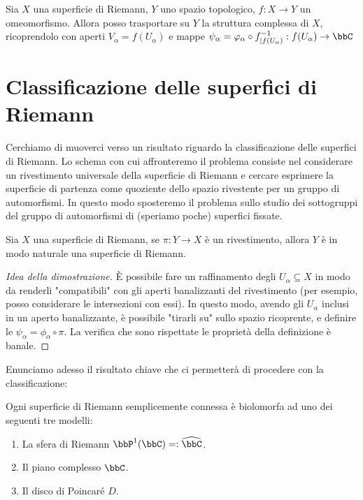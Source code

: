 \begin{osservazione}
Sia $X$ una superficie di Riemann, $Y$ uno spazio topologico, $f:X\rightarrow Y$ un omeomorfismo. Allora posso trasportare su $Y$ la struttura complessa di $X$, ricoprendolo con aperti $V_\alpha=f(U_\alpha)$ e mappe $\psi_\alpha=\varphi_\alpha \circ f^{-1}_{|f(U_\alpha)}:f(U_\alpha)\rightarrow\bbC$
\end{osservazione}


\section{Classificazione delle superfici di Riemann}
Cerchiamo di muoverci verso un risultato riguardo la classificazione delle superfici di Riemann. Lo schema con cui affronteremo il problema consiste nel considerare un rivestimento universale della superficie di Riemann e cercare esprimere la superficie di partenza come quoziente dello spazio rivestente per un gruppo di automorfismi. In questo modo sposteremo il problema sullo studio dei sottogruppi del gruppo di automorfismi di (speriamo poche) superfici fissate.
\begin{osservazione}
Sia $X$ una superficie di Riemann, se $\pi:Y\rightarrow X$ è un rivestimento, allora $Y$ è in modo naturale una superficie di Riemann.
\end{osservazione} 
\begin{proof}[Idea della dimostrazione]
È possibile fare un raffinamento degli $U_\alpha\subseteq X$ in modo da renderli "compatibili" con gli aperti banalizzanti del rivestimento (per esempio, posso considerare le intersezioni con essi). In questo modo, avendo gli $U_\alpha$ inclusi in un aperto banalizzante, è possibile "tirarli su" sullo spazio ricoprente, e definire le $\psi_\alpha=\phi_\alpha \circ \pi$. La verifica che sono rispettate le proprietà della definizione è banale.
\end{proof}
Enunciamo adesso il risultato chiave che ci permetterà di procedere con la classificazione:
\begin{teorema}[di Riemann]
Ogni superficie di Riemann semplicemente connessa è biolomorfa ad uno dei seguenti tre modelli:
\begin{enumerate}
  \item La sfera di Riemann $\bbP^1(\bbC)=:\widehat{\bbC}$.
  \item Il piano complesso $\bbC$.
  \item Il disco di Poincaré $D$.
\end{enumerate}
\end{teorema} 

